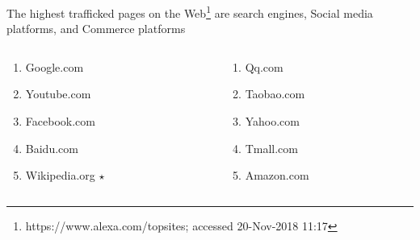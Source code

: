 \documentclass[aspectratio=169]{beamer}
\newcounter{savedenum}
\newcommand*{\saveenum}{\setcounter{savedenum}{\theenumi}}
\newcommand*{\resume}{\setcounter{enumi}{\thesavedenum}}
\begin{document}
{
%
\begin{frame}
\frametitle{}
The highest trafficked pages on the Web\footnote{https://www.alexa.com/topsites; accessed 20-Nov-2018 11:17} are search engines, Social media platforms, and Commerce platforms
\begin{center}
\begin{columns}[T]
  \begin{column}{.3\linewidth}
  \begin{enumerate}
	\item{Google.com}
	\item{Youtube.com}
	\item{Facebook.com}
	\item{Baidu.com}
	\item{Wikipedia.org $\star$}
    \saveenum
  \end{enumerate}
  \end{column}
  \begin{column}{.3\linewidth}
  \begin{enumerate}
    \resume
         \item{Qq.com}
	\item{Taobao.com}
	\item{Yahoo.com}
	\item{Tmall.com}
	\item{Amazon.com}  
	\end{enumerate}
  \end{column}
\end{columns}
\end{center}

\end{frame}
}
\end{document}
